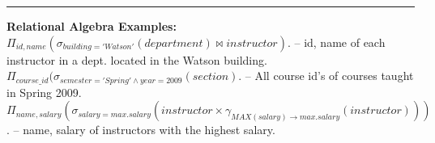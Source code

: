 \documentclass{report}
\renewcommand{\bf}[1]{\textbf{{#1}}}
\begin{document}
\vspace{-2em}
\hrule
\vspace{0.2em}
\small{\bf{Relational Algebra Examples:}}
\hfil \newline
$\Pi_{id, name} (\sigma_{building = 'Watson'}(department) \bowtie instructor)$. -- id, name of each
instructor in a dept. located in the Watson building.
\hfil \newline
$\Pi_{course\_id} (\sigma_{semester = 'Spring' \land year = 2009}(section)$. -- All course id's of
courses taught in Spring 2009.
\hfil \newline
$\Pi_{name, salary} (\sigma_{salary = max.salary}(instructor \times \gamma_{MAX(salary) \to
max.salary} (instructor)))$. -- name, salary of instructors with the highest salary.
\end{document}
